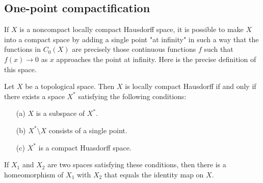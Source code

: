\subsection{One-point compactification}
If $X$ is a noncompact locally compact Hausdorff space, it is possible to make $X$ into a compact space by adding a single point "at infinity" in such a way that the functions in $C_0(X)$ are precisely those continuous functions $f$ such that $f(x)\to 0$ as $x$ approaches the point at infinity. Here is the precise definition of this space.
\begin{proposition}\label{one point compactification}
Let $X$ be a topological space. Then $X$ is locally compact Hausdorff if and only if there exists a space $X^*$ satisfying the following conditions:
\begin{itemize}
\item[(a)] $X$ is a subspace of $X^*$.
\item[(b)] $X^*\setminus X$ consists of a single point.
\item[(c)] $X^*$ is a compact Huasdorff space.
\end{itemize}
If $X_1$ and $X_2$ are two spaces satisfying these conditions, then there is a homeomorphism of $X_1$ with $X_2$ that equals the identity map on $X$.
\end{proposition}
